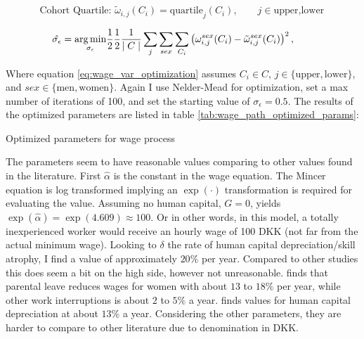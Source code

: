 \begin{equation}
    \text{Cohort Quartile: } {\tilde{\omega}}_{i, j} (C_i) = \text{quartile}_j (C_i), \qquad j\in{\text{upper}, \text{lower}} 
\end{equation}

\begin{equation}\label{eq:wage_var_optimization}
   \hat{\sigma_\epsilon}  = \underset{\sigma_\epsilon}{\operatorname*{arg\,min}} \frac{1}{2}\frac{1}{2}\frac{1}{\mid C \mid } \sum_{j} \sum_{sex}\sum_{C_i} \left( \omega_{i, j}^{sex}(C_i)  - \tilde{\omega}_{i,j}^{sex}(C_i)\right)^2, \qquad 
\end{equation}

Where equation \eqref{eq:wage_var_optimization} assumes $C_i \in C$, $j \in \{\text{upper},  \text{lower} \}$, and $sex \in \{\text{men}, \text{women} \}$. Again I use Nelder-Mead for optimization, set a max number of iterations of 100, and set the starting value of $\sigma_\epsilon = 0.5$. The results of the optimized parameters are listed in table \ref{tab:wage_path_optimized_params}:

\begin{table}[ht]
    \centering
    
    \caption{Optimized parameters for wage process}
    \label{tab:wage_path_optimized_params}
\end{table}

The parameters seem to have reasonable values comparing to other values found in the literature. First $\hat{\alpha} $ is the constant in the wage equation.
The Mincer equation is log transformed implying an $\exp (\cdot)$ transformation is required for evaluating the value. 
Assuming no human capital, $G=0$, yields $\exp (\hat{\alpha}) = \exp ( 4.609 ) \approx 100$. 
Or in other words, in this model, a totally inexperienced worker would receive an hourly wage of 100 DKK (not far from the actual minimum wage). 
Looking to $\delta$ the rate of human capital depreciation/skill atrophy, I find a value of approximately $20 \%$ per year. Compared to other studies this does seem a bit on the high side, however not unreasonable. \textcite{kunze_timing_2002} finds that parental leave reduces wages for women with about $13$ to $18 \%$ per year, while other work interruptions is about $2$  to $5 \%$ a year. \textcite{light_early-career_1995} finds values for human capital depreciation at about $13 \%$ a year. Considering the other parameters, they are harder to compare to other literature due to denomination in DKK. 


